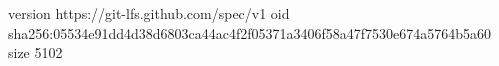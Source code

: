 version https://git-lfs.github.com/spec/v1
oid sha256:05534e91dd4d38d6803ca44ac4f2f05371a3406f58a47f7530e674a5764b5a60
size 5102
